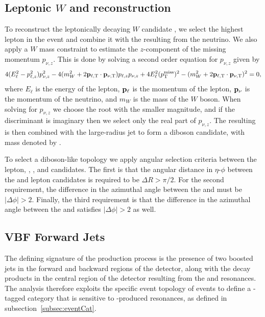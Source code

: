 \subsection{Leptonic $W$ and \WV reconstruction}

To reconstruct the leptonically decaying $W$ candidate \Wlep, we select the highest \pt lepton in the event and combine it with the \ptmissTI resulting from the neutrino.
We also apply a $W$ mass constraint to estimate the $z$-component of the missing momentum $p_{\nu,z}$.
This is done by solving a second order equation for $p_{\nu,z}$ given by
\begin{equation}
  4(E_\ell^2-p_{\ell,z}^2)p_{\nu,z}^2-4(m_W^2+2\vb{p}_{\ell,\mathrm{T}}\cdot\vb{p}_{\nu,\mathrm{T}})p_{\ell,z}p_{\nu,z}+4E_\ell^2(p_\mathrm{T}^\mathrm{miss})^2-(m_W^2+2\vb{p}_{\ell,\mathrm{T}}\cdot\vb{p}_{\nu,\mathrm{T}})^2=0,
\end{equation}
where $E_\ell$ is the energy of the lepton, $\vb{p}_\ell$ is the momentum of the lepton, $\vb{p}_\nu$ is the momentum of the neutrino, and $m_W$ is the mass of the $W$ boson.
When solving for $p_{\nu,z}$ we choose the root with the smaller magnitude, and if the discriminant is imaginary then we select only the real part of $p_{\nu,z}$.
The resulting \Wlep is then combined with the large-radius \Vhad jet to form a diboson candidate, with mass denoted by \MVV.

To select a diboson-like topology we apply angular selection criteria between the lepton, \Vhad, \Wlep, and \ptmissTI candidates.
The first is that the angular distance in $\eta$-$\phi$ between the \Vhad and lepton candidates is required to be $\Delta R>\pi/2$.
For the second requirement, the difference in the azimuthal angle between the \Vhad and \ptmissTI must be $|\Delta\phi|>2$.
Finally, the third requirement is that the difference in the azimuthal angle between the \Vhad and \Wlep satisfies $|\Delta\phi|>2$ as well.

\subsection{VBF Forward Jets}
\label{subsec:VBFjets}

The defining signature of the \VBF production process is the presence of two boosted jets in the forward and backward regions of the detector, along with the decay products in the central region of the detector resulting from the \Wlep and \Vhad resonances.
The analysis therefore exploits the specific event topology of \VBF events to define a \VBF-tagged category that is sensitive to \VBF-produced resonances, as defined in subsection~\ref{subsec:eventCat}.

